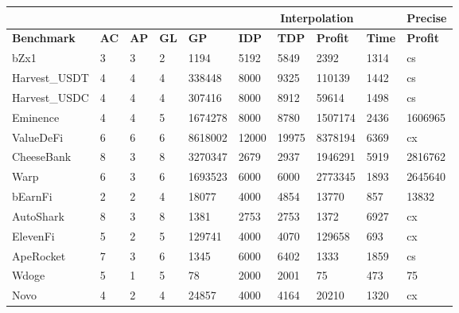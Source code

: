 \begin{table}[]
\begin{tabular}{|l|llll|llll|l|}
    \hline
\multicolumn{5}{|l|}{}                              & \multicolumn{4}{c|}{\textbf{Interpolation}}      & \textbf{Precise} \\ \hline
\textbf{Benchmark}     & \textbf{AC} & \textbf{AP} & \textbf{GL} & \textbf{GP}   & \textbf{IDP} & \textbf{TDP}  & \textbf{Profit}  & \textbf{Time} & \textbf{Profit}  \\
bZx1          & 3  & 3  & 2  & 1194                          & 5192            & 5849           & 2392         & 1314       & cs      \\
Harvest\_USDT & 4  & 4  & 4  & 338448                        & 8000            & 9325           & 110139       & 1442       & cs      \\
Harvest\_USDC & 4  & 4  & 4  & 307416                        & 8000            & 8912           & 59614        & 1498       & cs      \\
Eminence      & 4  & 4  & 5  & 1674278                       & 8000            & 8780           & 1507174      & 2436       & 1606965 \\
ValueDeFi     & 6  & 6  & 6  & 8618002                       & 12000           & 19975          & 8378194      & 6369       & cx       \\
CheeseBank    & 8  & 3  & 8  & 3270347                       & 2679            & 2937           & 1946291      & 5919       & 2816762 \\
Warp          & 6  & 3  & 6  & 1693523                       & 6000            & 6000           & 2773345      & 1893       & 2645640 \\
bEarnFi       & 2  & 2  & 4  & 18077                         & 4000            & 4854           & 13770        & 857        & 13832   \\
AutoShark     & 8  & 3  & 8  & 1381                          & 2753            & 2753           & 1372         & 6927       & cx       \\
ElevenFi      & 5  & 2  & 5  & 129741                        & 4000            & 4070           & 129658       & 693        & cx       \\ 
ApeRocket     & 7  & 3  & 6  & 1345                          & 6000            & 6402           & 1333         & 1859       & cs      \\ 
Wdoge         & 5  & 1  & 5  & 78                            & 2000            & 2001           & 75           & 473        & 75      \\ 
Novo          & 4  & 2  & 4  & 24857                         & 4000            & 4164           & 20210        & 1320       & cx       \\

\end{tabular}
\end{table}
